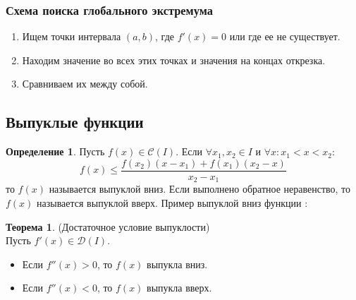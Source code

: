 \documentclass[a4paper, 12pt]{article}
\theoremstyle{definition}
\newtheorem*{definition}{Определение}
\newtheorem*{theorem}{Теорема}
\begin{document}
        \subsubsection*{Схема поиска глобального экстремума}
        \begin{enumerate}
            \item Ищем точки интервала $(a,b)$, где $f'(x)=0$ или где ее не существует. 
            \item Находим значение во всех этих точках и значения на концах открезка.
            \item Сравниваем их между собой.
        \end{enumerate}
        \subsection{Выпуклые функции}
        \begin{definition}
            Пусть $f(x)\in \mathcal{C}(I)$. Если $\forall x_1,x_2\in I$ и $\forall x: x_1<x<x_2$:
            \[f(x)\leq \frac{f(x_2)(x-x_1)+f(x_1)(x_2-x)}{x_2-x_1}\]
            то $f(x)$ называется выпуклой вниз. Если выполнено обратное неравенство, то $f(x)$ называется выпуклой вверх. Пример выпуклой вниз функции :
        \end{definition} 
        \begin{center}
        \end{center}
        \begin{theorem} (Достаточное условие выпуклости)\\
            Пусть $f'(x)\in \mathcal{D}(I)$.
            \begin{itemize}
                \item Если $f''(x)>0$, то $f(x)$ выпукла вниз.
                \item Если $f''(x)<0$, то $f(x)$ выпукла вверх.
            \end{itemize}
        \end{theorem} 
\end{document}
